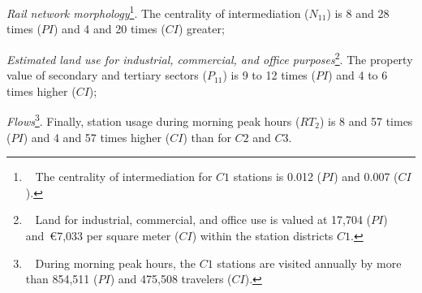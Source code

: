 \begin{refsegment}
\begin{customitemize}
    \item \textsl{Rail network morphology}\footnote{~
        The centrality of intermediation for \(C1\) stations is 0.012 (\(PI\)) and 0.007 (\(CI\)).
    }. The centrality of intermediation (\(N_{11}\)) is 8 and 28 times (\(PI\)) and 4 and 20 times (\(CI\)) greater;
    \item \textsl{Estimated land use for industrial, commercial, and office purposes}\footnote{~
        Land for industrial, commercial, and office use is valued at 17,704 (\(PI\)) and~\euro7,033 per square meter (\(CI\)) within the station districts \(C1\).
    }. The property value of secondary and tertiary sectors (\(P_{11}\)) is 9 to 12 times (\(PI\)) and 4 to 6 times higher (\(CI\));
    \item \textsl{Flows}\footnote{~
        During morning peak hours, the \(C1\) stations are visited annually by more than 854,511 (\(PI\)) and 475,508 travelers (\(CI\)).
    }. Finally, station usage during morning peak hours (\(RT_{2}\)) is 8 and 57 times (\(PI\)) and 4 and 57 times higher (\(CI\)) than for \(C2\) and \(C3\).
\end{customitemize}%


\end{refsegment}
